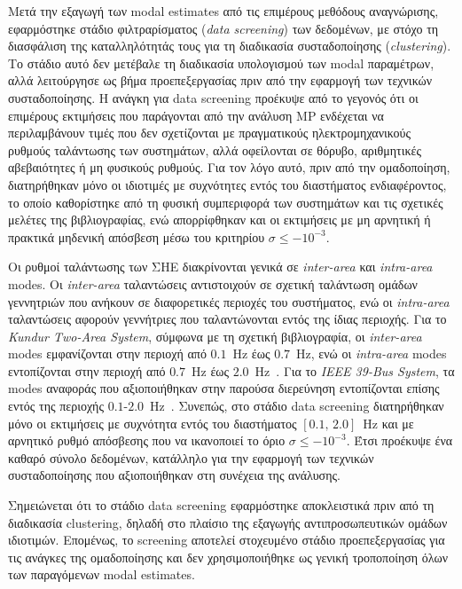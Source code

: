 \documentclass[conference]{IEEEtran}
\begin{document}
Μετά την εξαγωγή των modal estimates από τις επιμέρους μεθόδους αναγνώρισης, εφαρμόστηκε στάδιο φιλτραρίσματος (\textit{data screening}) των δεδομένων, με στόχο τη διασφάλιση της καταλληλότητάς τους για τη διαδικασία συσταδοποίησης (\textit{clustering}). Το στάδιο αυτό δεν μετέβαλε τη διαδικασία υπολογισμού των modal παραμέτρων, αλλά λειτούργησε ως βήμα προεπεξεργασίας πριν από την εφαρμογή των τεχνικών συσταδοποίησης. Η ανάγκη για data screening προέκυψε από το γεγονός ότι οι επιμέρους εκτιμήσεις που παράγονται από την ανάλυση MP ενδέχεται να περιλαμβάνουν τιμές που δεν σχετίζονται με πραγματικούς ηλεκτρομηχανικούς ρυθμούς ταλάντωσης των συστημάτων, αλλά οφείλονται σε θόρυβο, αριθμητικές αβεβαιότητες ή μη φυσικούς ρυθμούς. Για τον λόγο αυτό, πριν από την ομαδοποίηση, διατηρήθηκαν μόνο οι ιδιοτιμές με συχνότητες εντός του διαστήματος ενδιαφέροντος, το οποίο καθορίστηκε από τη φυσική συμπεριφορά των συστημάτων και τις σχετικές μελέτες της βιβλιογραφίας, ενώ απορρίφθηκαν και οι εκτιμήσεις με μη αρνητική ή πρακτικά μηδενική απόσβεση μέσω του κριτηρίου $\sigma \leq -10^{-3}$.

Οι ρυθμοί ταλάντωσης των ΣΗΕ διακρίνονται γενικά σε \textit{inter-area} και \textit{intra-area} modes. Οι \textit{inter-area} ταλαντώσεις αντιστοιχούν σε σχετική ταλάντωση ομάδων γεννητριών που ανήκουν σε διαφορετικές περιοχές του συστήματος, ενώ οι \textit{intra-area} ταλαντώσεις αφορούν γεννήτριες που ταλαντώνονται εντός της ίδιας περιοχής. Για το \textit{Kundur Two-Area System}, σύμφωνα με τη σχετική βιβλιογραφία, οι \textit{inter-area} modes εμφανίζονται στην περιοχή από $0.1$~Hz έως $0.7$~Hz, ενώ οι \textit{intra-area} modes εντοπίζονται στην περιοχή από $0.7$~Hz έως $2.0$~Hz~\cite{estimation2021}. Για το \textit{IEEE 39-Bus System}, τα modes αναφοράς που αξιοποιήθηκαν στην παρούσα διερεύνηση εντοπίζονται επίσης εντός της περιοχής $0.1$-$2.0$~Hz~\cite{sarkar2024drga}. Συνεπώς, στο στάδιο data screening διατηρήθηκαν μόνο οι εκτιμήσεις με συχνότητα εντός του διαστήματος $[0.1,\,2.0]$~Hz και με αρνητικό ρυθμό απόσβεσης που να ικανοποιεί το όριο $\sigma \leq -10^{-3}$. Έτσι προέκυψε ένα καθαρό σύνολο δεδομένων, κατάλληλο για την εφαρμογή των τεχνικών συσταδοποίησης που αξιοποιήθηκαν στη συνέχεια της ανάλυσης.

Σημειώνεται ότι το στάδιο data screening εφαρμόστηκε αποκλειστικά πριν από τη διαδικασία clustering, δηλαδή στο πλαίσιο της εξαγωγής αντιπροσωπευτικών ομάδων ιδιοτιμών. Επομένως, το screening αποτελεί στοχευμένο στάδιο προεπεξεργασίας για τις ανάγκες της ομαδοποίησης και δεν χρησιμοποιήθηκε ως γενική τροποποίηση όλων των παραγόμενων modal estimates.
\end{document}
